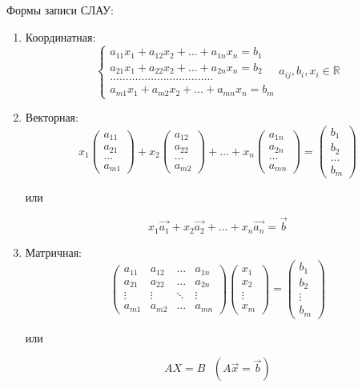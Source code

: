 \noindent
Формы записи СЛАУ:
\begin{enumerate}
    \item Координатная: 
    $$
    \begin{cases}
        a_{11}x_1+a_{12}x_2+\ldots+a_{1n}x_n = b_1\\
        a_{21}x_1+a_{22}x_2+\ldots+a_{2n}x_n = b_2\\
        \ldots\ldots\ldots\ldots\ldots\ldots\ldots\ldots\ldots\ldots\ldots\\
        a_{m1}x_1+a_{m2}x_2+\ldots+a_{mn}x_n = b_m
    \end{cases}
    a_{ij}, b_i, x_i \in \mathbb{R}
    $$
    \item Векторная:
    $$x_1
    \begin{pmatrix}
        a_{11}\\a_{21}\\\ldots\\a_{m1}
    \end{pmatrix}+x_2
    \begin{pmatrix}
        a_{12}\\a_{22}\\\ldots\\a_{m2}
    \end{pmatrix}+...+x_n
    \begin{pmatrix}
        a_{1n}\\a_{2n}\\\ldots\\a_{mn}
    \end{pmatrix}=
    \begin{pmatrix}
        b_{1}\\b_{2}\\\ldots\\b_{m}
    \end{pmatrix}
    $$
    \begin{center} или \end{center}
    $$
    x_1\vec{a_1}+x_2\vec{a_2}+...+x_n\vec{a_n} = \vec{b}
    $$
    \item Матричная:
    $$
    \begin{pmatrix}
        a_{11}&a_{12}&\ldots&a_{1n}\\
        a_{21}&a_{22}&\ldots&a_{2n}\\
        \vdots&\vdots&\ddots&\vdots\\
        a_{m1}&a_{m2}&\ldots&a_{mn}
    \end{pmatrix}
    \begin{pmatrix}
        x_{1}\\x_{2}\\\vdots\\x_{m}
    \end{pmatrix} = 
    \begin{pmatrix}
        b_{1}\\b_{2}\\\vdots\\b_{m}
    \end{pmatrix}
    $$
    \begin{center} или \end{center}
    $$
    AX = B \text{ } (A\vec{x} = \vec{b})
    $$
    
\end{enumerate}

